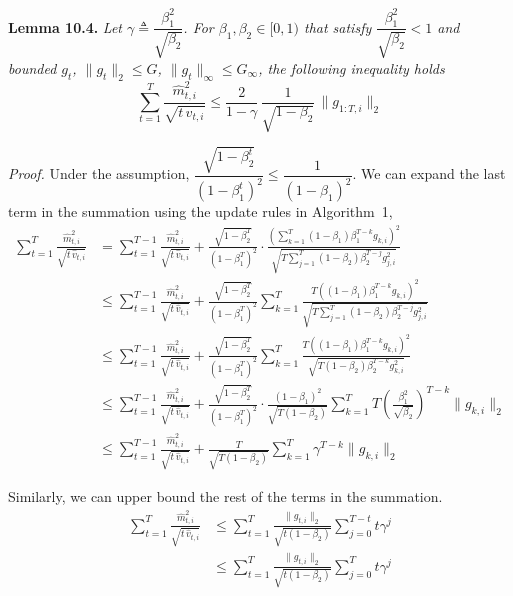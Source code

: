\documentclass[11pt]{article}
\begin{document}
\noindent\textbf{Lemma 10.4.} \emph{Let
$\gamma \triangleq \dfrac{\beta_1^2}{\sqrt{\beta_2}}$. For
$\beta_1, \beta_2 \in [0, 1)$ that satisfy
$\dfrac{\beta_1^2}{\sqrt{\beta_2}} < 1$ and bounded $g_t$,
$\|g_t\|_2 \leq G$, $\|g_t\|_\infty \leq G_\infty$, the following
inequality holds}
\[
\sum_{t=1}^{T} \frac{\widehat{m}_{t,i}^2}{\sqrt{t\,\widehat{v}_{t,i}}}
 \leq \frac{2}{1 - \gamma}\,\frac{1}{\sqrt{1 - \beta_2}}\,\|g_{1:T,i}\|_2
\]

\noindent\emph{Proof.} Under the assumption,
$\dfrac{\sqrt{1 - \beta_2^t}}{(1 - \beta_1^t)^2}
 \leq \dfrac{1}{(1 - \beta_1)^2}$.
We can expand the last term in the summation using the update
rules in Algorithm~1,
\begin{align*}
\sum_{t=1}^{T} \frac{\widehat{m}_{t,i}^2}{\sqrt{t\,\widehat{v}_{t,i}}}
 &= \sum_{t=1}^{T-1} \frac{\widehat{m}_{t,i}^2}{\sqrt{t\,\widehat{v}_{t,i}}}
    + \frac{\sqrt{1 - \beta_2^T}}{(1 - \beta_1^T)^2}
      \cdot \frac{\left(\sum_{k=1}^{T}(1 - \beta_1)\beta_1^{T-k} g_{k,i}\right)^{\!2}}
                 {\sqrt{T \sum_{j=1}^{T}(1 - \beta_2)\beta_2^{T-j} g_{j,i}^2}} \\[0.4em]
 &\leq \sum_{t=1}^{T-1} \frac{\widehat{m}_{t,i}^2}{\sqrt{t\,\widehat{v}_{t,i}}}
    + \frac{\sqrt{1 - \beta_2^T}}{(1 - \beta_1^T)^2}
      \sum_{k=1}^{T} \frac{T\left((1 - \beta_1)\beta_1^{T-k} g_{k,i}\right)^{2}}
                           {\sqrt{T \sum_{j=1}^{T}(1 - \beta_2)\beta_2^{T-j} g_{j,i}^2}} \\[0.4em]
 &\leq \sum_{t=1}^{T-1} \frac{\widehat{m}_{t,i}^2}{\sqrt{t\,\widehat{v}_{t,i}}}
    + \frac{\sqrt{1 - \beta_2^T}}{(1 - \beta_1^T)^2}
      \sum_{k=1}^{T} \frac{T\left((1 - \beta_1)\beta_1^{T-k} g_{k,i}\right)^{2}}
                           {\sqrt{T(1 - \beta_2)\beta_2^{T-k} g_{k,i}^2}} \\[0.4em]
 &\leq \sum_{t=1}^{T-1} \frac{\widehat{m}_{t,i}^2}{\sqrt{t\,\widehat{v}_{t,i}}}
    + \frac{\sqrt{1 - \beta_2^T}}{(1 - \beta_1^T)^2}
      \cdot \frac{(1 - \beta_1)^2}{\sqrt{T(1 - \beta_2)}}
      \sum_{k=1}^{T} T\!\left(\frac{\beta_1^2}{\sqrt{\beta_2}}\right)^{\!T-k}
      \|g_{k,i}\|_2 \\[0.4em]
 &\leq \sum_{t=1}^{T-1} \frac{\widehat{m}_{t,i}^2}{\sqrt{t\,\widehat{v}_{t,i}}}
    + \frac{T}{\sqrt{T(1 - \beta_2)}}
      \sum_{k=1}^{T} \gamma^{T-k} \|g_{k,i}\|_2
\end{align*}

\noindent
Similarly, we can upper bound the rest of the terms in the
summation.
\begin{align*}
\sum_{t=1}^{T} \frac{\widehat{m}_{t,i}^2}{\sqrt{t\,\widehat{v}_{t,i}}}
 &\leq \sum_{t=1}^{T} \frac{\|g_{t,i}\|_2}{\sqrt{t(1 - \beta_2)}}
       \sum_{j=0}^{T-t} t\gamma^{j} \\
 &\leq \sum_{t=1}^{T} \frac{\|g_{t,i}\|_2}{\sqrt{t(1 - \beta_2)}}
       \sum_{j=0}^{T} t\gamma^{j}
\end{align*}
\end{document}
